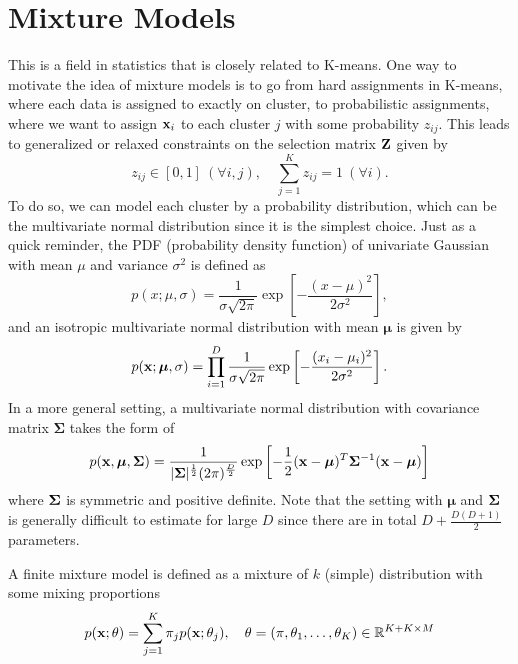 \documentclass[../main.tex]{subfiles}
\begin{document}
\section{Mixture Models}
This is a field in statistics that is closely related to K-means. One way to motivate the idea of mixture models is to go from hard assignments in K-means, where each data is assigned to exactly on cluster, to probabilistic assignments, where we want to assign ${\bf x}_i$ to each cluster $j$ with some probability $z_{ij}$. This leads to generalized or relaxed constraints on the selection matrix ${\bf Z}$ given by
\begin{equation*}
z_{ij}\in [0,1]\ (\forall i,j),\quad \sum_{j=1}^{K}z_{ij}=1\ (\forall i).
\end{equation*}
To do so, we can model each cluster by a probability distribution, which can be the multivariate normal distribution since it is the simplest choice. Just as a quick reminder, the PDF (probability density function) of univariate Gaussian with mean $\mu$ and variance $\sigma^2$ is defined as
\begin{equation*}
p(x;\mu,\sigma)=\frac{1}{\sigma\sqrt{2\pi}}\exp\left[-\frac{(x-\mu)^2}{2\sigma^2}\right],
\end{equation*}
and an isotropic multivariate normal distribution with mean $\bm{\mu}$ is given by
\begin{equation*}
p({\bf x};\bm{\mu},\sigma)=\prod_{i=1}^{D}\frac{1}{\sigma\sqrt{2\pi}}\exp\left[-\frac{(x_i-\mu_i)^2}{2\sigma^2}\right].
\end{equation*}
In a more general setting, a multivariate normal distribution with covariance matrix $\bm{\Sigma}$ takes the form of
\begin{equation*}
p({\bf x},\bm{\mu},{\bf \Sigma})=\frac{1}{|{\bf \Sigma}|^{\frac{1}{2}}(2\pi)^{\frac{D}{2}}}\exp\left[-\frac{1}{2 }({\bf x}-\bm{\mu})^T{\bf \Sigma}^{-1}({\bf x}-\bm{\mu})\right]
\end{equation*}
where ${\bf \Sigma}$ is symmetric and positive definite. Note that the setting with $\bm{\mu}$ and ${\bf \Sigma}$ is generally difficult to estimate for large $D$ since there are in total $D+\frac{D(D+1)}{2}$ parameters.
\par A finite mixture model is defined as a mixture of $k$ (simple) distribution with some mixing proportions
\begin{equation*}
p({\bf x};\theta)=\sum_{j=1}^{K}\pi_jp({\bf x};\theta_j),\quad \theta=(\pi,\theta_1,\dots,\theta_K)\in \mathbb{R}^{K+K\times M}
\end{equation*}
\end{document}

